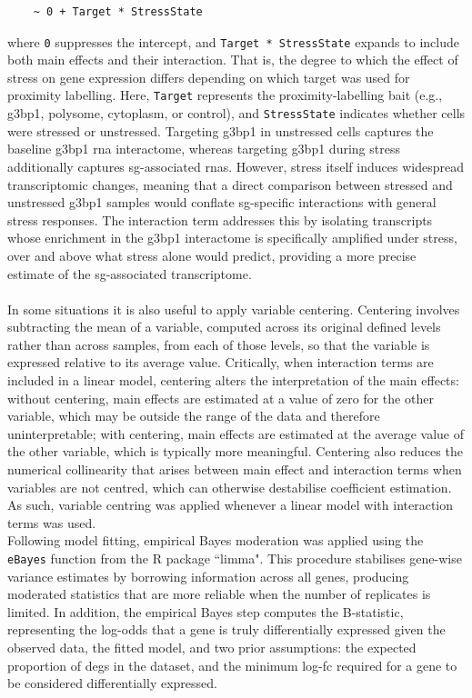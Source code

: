 \begin{verbatim}
	~ 0 + Target * StressState
\end{verbatim}
\noindent
where \texttt{0} suppresses the intercept, and \texttt{Target * StressState} expands to include both main effects and their interaction. That is, the degree to which the effect of stress on gene expression differs depending on which target was used for proximity labelling.
Here, \texttt{Target} represents the proximity-labelling bait (e.g., \gls{g3bp1}, polysome, cytoplasm, or control), and \texttt{StressState} indicates whether cells were stressed or unstressed. Targeting \gls{g3bp1} in unstressed cells captures the baseline \gls{g3bp1} \gls{rna} interactome, whereas targeting \gls{g3bp1} during stress additionally captures \gls{sg}-associated \glspl{rna}. However, stress itself induces widespread transcriptomic changes, meaning that a direct comparison between stressed and unstressed \gls{g3bp1} samples would conflate \gls{sg}-specific interactions with general stress responses. The interaction term addresses this by isolating transcripts whose enrichment in the \gls{g3bp1} interactome is specifically amplified under stress, over and above what stress alone would predict, providing a more precise estimate of the \gls{sg}-associated transcriptome.
\\
\\
In some situations it is also useful to apply variable centering. Centering involves subtracting the mean of a variable, computed across its original defined levels rather than across samples, from each of those levels, so that the variable is expressed relative to its average value. Critically, when interaction terms are included in a linear model, centering alters the interpretation of the main effects: without centering, main effects are estimated at a value of zero for the other variable, which may be outside the range of the data and therefore uninterpretable; with centering, main effects are estimated at the average value of the other variable, which is typically more meaningful\cite{hofmann_centering_1998}. Centering also reduces the numerical collinearity that arises between main effect and interaction terms when variables are not centred, which can otherwise destabilise coefficient estimation\cite{hofmann_centering_1998}. As such, variable centring was applied whenever a linear model with interaction terms was used.
\\
\linebreak
\noindent
Following model fitting, empirical Bayes moderation\cite{smyth_linear_nodate} was applied using the \texttt{eBayes} function from the R package ``limma"\cite{ritchie_limma_2015}. This procedure stabilises gene-wise variance estimates by borrowing information across all genes, producing moderated statistics that are more reliable when the number of replicates is limited\cite{smyth_linear_nodate}. In addition, the empirical Bayes step computes the B-statistic, representing the log-odds that a gene is truly differentially expressed given the observed data, the fitted model, and two prior assumptions: the expected proportion of \glspl{deg} in the dataset, and the minimum log-\gls{fc} required for a gene to be considered differentially expressed\cite{smyth_linear_nodate}.
